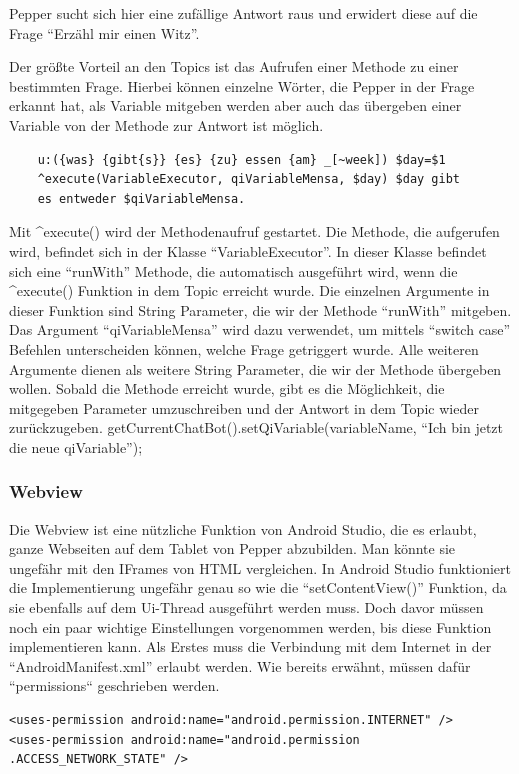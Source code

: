 Pepper sucht sich hier eine zufällige Antwort raus und erwidert diese auf die Frage ``Erzähl mir einen Witz''. 

Der größte Vorteil an den Topics ist das Aufrufen einer Methode zu einer bestimmten Frage. 
Hierbei können einzelne Wörter, die Pepper in der Frage erkannt hat, als Variable mitgeben werden aber auch das übergeben einer Variable von 
der Methode zur Antwort ist möglich.

\begin{lstlisting}
    u:({was} {gibt{s}} {es} {zu} essen {am} _[~week]) $day=$1 
    ^execute(VariableExecutor, qiVariableMensa, $day) $day gibt 
    es entweder $qiVariableMensa.
\end{lstlisting}

Mit \string^execute() wird der Methodenaufruf gestartet. Die Methode, die aufgerufen wird, befindet sich in der Klasse ``VariableExecutor''. 
In dieser Klasse befindet sich eine ``runWith'' Methode, die automatisch ausgeführt wird, wenn die \string^execute() Funktion in dem Topic 
erreicht wurde.
Die einzelnen Argumente in dieser Funktion sind String Parameter, die wir der Methode ``runWith'' mitgeben. Das Argument 
``qiVariableMensa'' wird dazu verwendet, um mittels ``switch case'' Befehlen unterscheiden können, welche Frage getriggert wurde. 
Alle weiteren Argumente dienen als weitere String Parameter, die wir der Methode übergeben wollen. Sobald die Methode erreicht wurde, gibt es 
die Möglichkeit, die mitgegeben Parameter umzuschreiben und der Antwort in dem Topic wieder zurückzugeben. 
getCurrentChatBot().setQiVariable(variableName, ``Ich bin jetzt die neue qiVariable'');

\subsubsection{Webview}

Die Webview ist eine nützliche Funktion von Android Studio, die es erlaubt, ganze Webseiten auf dem Tablet von Pepper abzubilden. Man könnte sie ungefähr mit den IFrames von HTML vergleichen. In Android Studio funktioniert die Implementierung ungefähr genau so wie die ``setContentView()'' Funktion, da sie ebenfalls auf dem Ui-Thread ausgeführt werden muss. Doch davor müssen noch ein paar wichtige Einstellungen vorgenommen werden, bis diese Funktion implementieren kann. 
Als Erstes muss die Verbindung mit dem Internet in der ``AndroidManifest.xml'' erlaubt werden. Wie bereits erwähnt, müssen dafür ``permissions`` geschrieben werden. 
\begin{lstlisting}
<uses-permission android:name="android.permission.INTERNET" />
<uses-permission android:name="android.permission
.ACCESS_NETWORK_STATE" />
\end{lstlisting}

